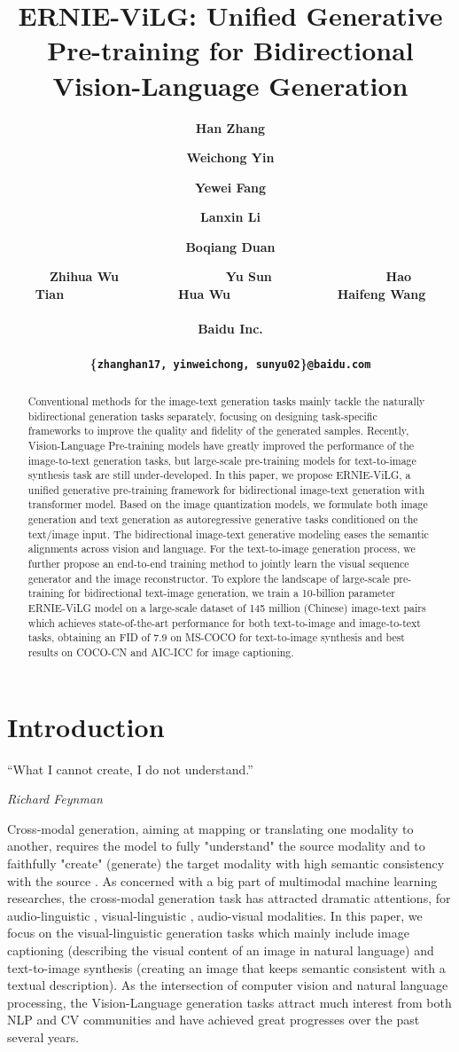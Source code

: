 \documentclass{article}
\title{ERNIE-ViLG: Unified Generative Pre-training for Bidirectional Vision-Language Generation}
\author{\textbf{Han Zhang} \and \textbf{Weichong Yin} \and \textbf{Yewei Fang} \and \textbf{Lanxin Li} \\
\and \textbf{Boqiang Duan} \\ 
\and \textbf{Zhihua Wu~~~~~~~~~~~~~~~Yu Sun~~~~~~~~~~~~~~~~Hao Tian~~~~~~~~~~~~~~~~Hua Wu~~~~~~~~~~~~~~~Haifeng Wang}\\ \\
\bf{ Baidu Inc}. \\ \\
 \{\texttt{zhanghan17, yinweichong, sunyu02}\}\texttt{@baidu.com} \\
}
\begin{document}
\maketitle
\begin{abstract}
Conventional methods for the image-text generation tasks mainly tackle the naturally bidirectional generation tasks separately, focusing on designing task-specific frameworks to improve the quality and fidelity of the generated samples. 
Recently, Vision-Language Pre-training models have greatly improved the performance of the image-to-text generation tasks, but large-scale pre-training models for text-to-image synthesis task are still under-developed.
In this paper, we propose ERNIE-ViLG, a unified generative pre-training framework for bidirectional image-text generation with transformer model. Based on the image quantization models, we formulate both image generation and text generation as autoregressive generative tasks conditioned on the text/image input. 
The bidirectional image-text generative modeling eases the semantic alignments across vision and language. 
For the text-to-image generation process, we further propose an end-to-end training method to jointly learn the visual sequence generator and the image reconstructor. 
To explore the landscape of large-scale pre-training for bidirectional text-image generation, we train a 10-billion parameter ERNIE-ViLG model on a large-scale dataset of 145 million (Chinese) image-text pairs which achieves state-of-the-art performance for both text-to-image and image-to-text tasks, obtaining an FID of 7.9 on MS-COCO for text-to-image synthesis and best results on COCO-CN and AIC-ICC for image captioning. 
\end{abstract}


\section{Introduction}
\epigraph{``What I cannot create, I do not understand.''}{\textit{Richard Feynman}}
Cross-modal generation, aiming at mapping or translating one modality to another, requires the model to fully "understand" the source modality and to faithfully "create" (generate) the target modality with high semantic consistency with the source  \cite{baltruvsaitis2018multimodal}. As concerned with a big part of multimodal machine learning researches, the cross-modal generation task has attracted dramatic attentions, for audio-linguistic \cite{hinton2012deep,oord2016wavenet}, visual-linguistic \cite{vinyals2015show,reed2016generative,anderson2018bottom,zhou2020unified,zhang2021cross,ramesh2021zero},  audio-visual \cite{chen2017deep,zelaszczyk2021audio} modalities. In this paper, we focus on the visual-linguistic generation tasks which mainly include image captioning (describing the visual content of an image in natural language) and text-to-image synthesis (creating an image that keeps semantic consistent with a textual description). As the intersection of computer vision and natural language processing, the Vision-Language generation tasks attract much interest from both NLP and CV communities and have achieved great progresses over the past several years. 
\end{document}

